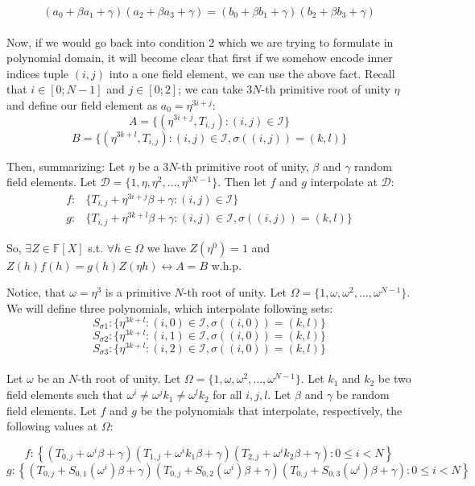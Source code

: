 \documentclass[../lecture-notes.tex]{subfiles}
\begin{document}
\[(a_0 + \beta a_1 + \gamma)(a_2 + \beta a_3 + \gamma) = (b_0 + \beta b_1 + \gamma)(b_2 + \beta b_3 + \gamma)\]
\\
Now, if we would go back into condition 2 which we are trying to formulate in polynomial domain, it will become clear that first if we somehow encode inner indices tuple $(i, j)$ into a one field element, we can use the above fact.
Recall that $i \in [0; N-1]$ and $j \in [0; 2]$; we can take $3N$-th primitive root of unity $\eta$ and define our field element as \(a_0 = \eta^{3i + j}\):
\[A = \{(\eta^{3i+j}, T_{i,j}) : (i, j) \in \mathcal{I}\}\]
\[B = \{(\eta^{3k+l}, T_{i,j}) : (i, j) \in \mathcal{I}, \sigma((i, j)) = (k, l)\}\]

Then, summarizing:
Let $\eta$ be a $3N$-th primitive root of unity, $\beta$ and $\gamma$ random field elements. Let $\mathcal{D} = \{1, \eta, \eta^2, \ldots, \eta^{3N-1}\}$. Then let $f$ and $g$ interpolate at $\mathcal{D}$:
\begin{align*}
    f: & \{T_{i,j} + \eta^{3i+j}\beta + \gamma : (i, j) \in \mathcal{I}\} \\
    g: & \{T_{i,j} + \eta^{3k+l}\beta + \gamma : (i, j) \in \mathcal{I}, \sigma((i, j)) = (k, l)\}
\end{align*}

So, $\exists Z \in \mathbb{F}[X]$ s.t. $\forall h \in \Omega$ we have $Z(\eta^{0}) = 1$ and $Z(h)f(h) = g(h)Z(\eta h) \leftrightarrow A = B$ w.h.p.

Notice, that $\omega = \eta^3$ is a primitive $N$-th root of unity. Let \(\Omega = \{1, \omega, \omega^2, \ldots, \omega^{N-1}\}\). 
We will define three polynomials, which interpolate following sets:
\[S_{\sigma 1}: \{\eta^{3k+l} : (i, 0) \in \mathcal{I}, \sigma((i, 0)) = (k, l)\}\]
\[S_{\sigma 2}: \{\eta^{3k+l} : (i, 1) \in \mathcal{I}, \sigma((i, 0)) = (k, l)\}\]
\[S_{\sigma 3}: \{\eta^{3k+l} : (i, 2) \in \mathcal{I}, \sigma((i, 0)) = (k, l)\}\]
\\
Let $\omega$ be an $N$-th root of unity. Let $\Omega = \{1, \omega, \omega^2, \ldots, \omega^{N-1}\}$. Let $k_1$ and $k_2$ be two field elements such that $\omega^i \neq \omega^j k_1 \neq \omega^l k_2$ for all $i, j, l$. Let $\beta$ and $\gamma$ be random field elements. Let $f$ and $g$ be the polynomials that interpolate, respectively, the following values at $\Omega$:

\[f: \left\{\left(T_{0,j} + \omega^i \beta + \gamma\right)\left(T_{1,j} + \omega^i k_1 \beta + \gamma\right)\left(T_{2,j} + \omega^i k_2 \beta + \gamma\right) : 0 \leq i < N\right\}\]
\[g: \left\{\left(T_{0,j} + S_{0,1}(\omega^i) \beta + \gamma\right)\left(T_{0,j} + S_{0,2}(\omega^i) \beta + \gamma\right)\left(T_{0,j} + S_{0,3}(\omega^i) \beta + \gamma\right) : 0 \leq i < N\right\}\]
\end{document}
